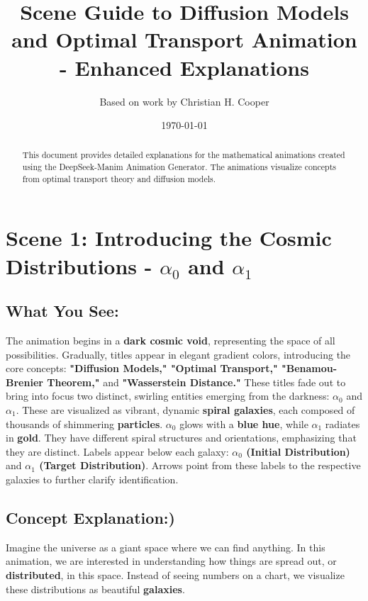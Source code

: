 \documentclass{article}
\title{Scene Guide to Diffusion Models and Optimal Transport Animation - Enhanced Explanations}
\author{Based on work by Christian H. Cooper}
\date{\today}
\begin{document}
\maketitle

\begin{abstract}
This document provides detailed explanations for the mathematical animations created using the DeepSeek-Manim Animation Generator. The animations visualize concepts from optimal transport theory and diffusion models.
\end{abstract}

\section*{Scene 1: Introducing the Cosmic Distributions - \( \alpha_0 \) and \( \alpha_1 \)}

\subsection*{What You See:}

The animation begins in a \textbf{dark cosmic void}, representing the space of all possibilities. Gradually, titles appear in elegant gradient colors, introducing the core concepts: \textbf{"Diffusion Models," "Optimal Transport," "Benamou-Brenier Theorem,"} and \textbf{"Wasserstein Distance."} These titles fade out to bring into focus two distinct, swirling entities emerging from the darkness: \textbf{\( \alpha_0 \)} and \textbf{\( \alpha_1 \)}. These are visualized as vibrant, dynamic \textbf{spiral galaxies}, each composed of thousands of shimmering \textbf{particles}. \( \alpha_0 \) glows with a \textbf{blue hue}, while \( \alpha_1 \) radiates in \textbf{gold}. They have different spiral structures and orientations, emphasizing that they are distinct.  Labels appear below each galaxy: \textbf{\( \alpha_0 \) (Initial Distribution)} and \textbf{\( \alpha_1 \) (Target Distribution)}. Arrows point from these labels to the respective galaxies to further clarify identification.

\subsection*{Concept Explanation:)}

Imagine the universe as a giant space where we can find anything. In this animation, we are interested in understanding how things are spread out, or \textbf{distributed}, in this space.  Instead of seeing numbers on a chart, we visualize these distributions as beautiful \textbf{galaxies}.
\end{document}
